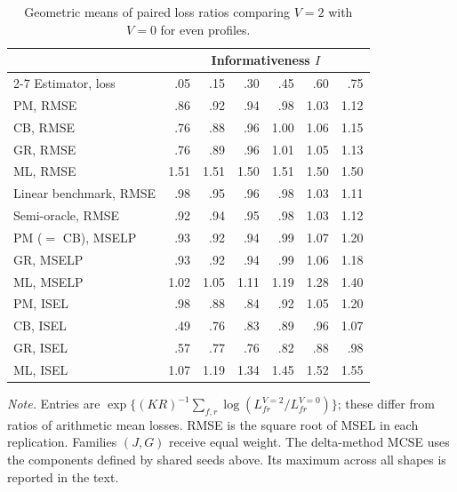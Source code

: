 \begin{table}[!ht]
\caption{Geometric means of paired loss ratios comparing $V=2$ with $V=0$ for even profiles.}
\label{tab:F-ratios}
\centering
\begin{tablebody}
\begin{tabular}{@{}lrrrrrr@{}}
\toprule
& \multicolumn{6}{c}{Informativeness $I$} \\
\cmidrule(lr){2-7}
Estimator, loss & .05 & .15 & .30 & .45 & .60 & .75 \\
\midrule
PM, RMSE & .86 & .92 & .94 & .98 & 1.03 & 1.12 \\
\addlinespace[5pt]
CB, RMSE & .76 & .88 & .96 & 1.00 & 1.06 & 1.15 \\
\addlinespace[5pt]
GR, RMSE & .76 & .89 & .96 & 1.01 & 1.05 & 1.13 \\
\addlinespace[5pt]
ML, RMSE & 1.51 & 1.51 & 1.50 & 1.51 & 1.50 & 1.50 \\
\addlinespace[9pt]
Linear benchmark, RMSE & .98 & .95 & .96 & .98 & 1.03 & 1.11 \\
\addlinespace[5pt]
Semi-oracle, RMSE & .92 & .94 & .95 & .98 & 1.03 & 1.12 \\
\addlinespace[9pt]
PM ($=$ CB), MSELP & .93 & .92 & .94 & .99 & 1.07 & 1.20 \\
\addlinespace[5pt]
GR, MSELP & .93 & .92 & .94 & .99 & 1.06 & 1.18 \\
\addlinespace[5pt]
ML, MSELP & 1.02 & 1.05 & 1.11 & 1.19 & 1.28 & 1.40 \\
\addlinespace[9pt]
PM, ISEL & .98 & .88 & .84 & .92 & 1.05 & 1.20 \\
\addlinespace[5pt]
CB, ISEL & .49 & .76 & .83 & .89 & .96 & 1.07 \\
\addlinespace[5pt]
GR, ISEL & .57 & .77 & .76 & .82 & .88 & .98 \\
\addlinespace[5pt]
ML, ISEL & 1.07 & 1.19 & 1.34 & 1.45 & 1.52 & 1.55 \\
\bottomrule
\end{tabular}
\end{tablebody}
\par\vspace{0.4\baselineskip}
\begin{minipage}{\linewidth}\normalsize\doublespacing\raggedright
\textit{Note.} Entries are $\exp\{(KR)^{-1}\sum_{f,r}\log(L^{V=2}_{fr}/L^{V=0}_{fr})\}$; these differ from ratios of arithmetic mean losses. RMSE is the square root of MSEL in each replication. Families $(J,G)$ receive equal weight. The delta-method MCSE uses the components defined by shared seeds above. Its maximum across all shapes is reported in the text.
\end{minipage}
\end{table}
